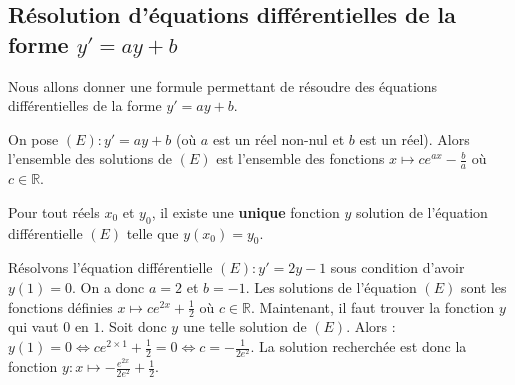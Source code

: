 	\subsection{Résolution d'équations différentielles de la forme \texorpdfstring{$y'=ay+b$}{y'=ay+b}}

	Nous allons donner une formule permettant de résoudre des équations différentielles de la forme $y' = ay+b$.

	\begin{formula}[Formule]
		On pose $(E) : y'=ay+b$ (où $a$ est un réel non-nul et $b$ est un réel). Alors l'ensemble des solutions de $(E)$ est l'ensemble des fonctions $x \mapsto c e^{ax} - \frac{b}{a}$ où $c \in \mathbb{R}$.
	\end{formula}

	\begin{formula}[Théorème]
		Pour tout réels $x_0$ et $y_0$, il existe une \textbf{unique} fonction $y$ solution de l'équation différentielle $(E)$ telle que $y(x_0) = y_0$.
	\end{formula}

	\begin{tip}[Exemple]
		Résolvons l'équation différentielle $(E) : y'=2y-1$ sous condition d'avoir $y(1) = 0$.
		\newpar
		On a donc $a = 2$ et $b = -1$. Les solutions de l'équation $(E)$ sont les fonctions définies $x \mapsto c e^{2x} + \frac{1}{2}$ où $c \in \mathbb{R}$.
		\newpar
		Maintenant, il faut trouver la fonction $y$ qui vaut $0$ en $1$. Soit donc $y$ une telle solution de $(E)$. Alors :
		\newpar
		$y(1) =  0 \iff c e^{2 \times 1} + \frac{1}{2} = 0 \iff c = -\frac{1}{2e^2}$. La solution recherchée est donc la fonction $y : x \mapsto -\frac{e^{2x}}{2e^2} + \frac{1}{2}$.
	\end{tip}

